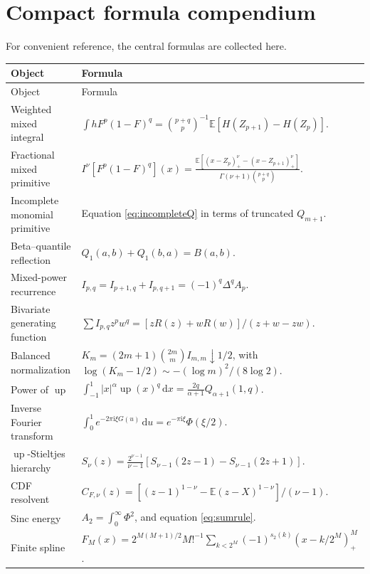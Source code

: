 \documentclass[11pt,oneside]{article}
\theoremstyle{definition}
\theoremstyle{remark}
\newcommand{\F}{F}
\newcommand{\G}{G}
\newcommand{\Up}{\operatorname{up}}
\newcommand{\E}{\mathbb E}
\newcommand{\dd}{\,\mathrm d}
\newcommand{\ii}{\mathrm i}
\begin{document}
\section{Compact formula compendium}

For convenient reference, the central formulas are collected here.

\begin{longtable}{>{\raggedright\arraybackslash}p{}p{}}
\toprule
Object & Formula \\
\midrule
\endfirsthead
\toprule
Object & Formula \\
\midrule
\endhead
Weighted mixed integral &
\(\displaystyle
\int h\F^p(1-\F)^q
=\binom{p+q}{p}^{-1}\E[H(Z_{p+1})-H(Z_p)]\).\\[0.75em]
Fractional mixed primitive &
\(\displaystyle
I^\nu[\F^p(1-\F)^q](x)
=\frac{\E[(x-Z_p)_+^\nu-(x-Z_{p+1})_+^\nu]}
{\Gamma(\nu+1)\binom{p+q}{p}}\).\\[0.75em]
Incomplete monomial primitive &
Equation \eqref{eq:incompleteQ} in terms of truncated \(Q_{m+1}\).\\[0.5em]
Beta--quantile reflection &
\(Q_1(a,b)+Q_1(b,a)=B(a,b)\).\\[0.5em]
Mixed-power recurrence &
\(I_{p,q}=I_{p+1,q}+I_{p,q+1}=(-1)^q\Delta^qA_p\).\\[0.5em]
Bivariate generating function &
\(\displaystyle\sum I_{p,q}z^pw^q=[zR(z)+wR(w)]/(z+w-zw)\).\\[0.75em]
Balanced normalization &
\(K_m=(2m+1)\binom{2m}{m}I_{m,m}\downarrow1/2\), with
\(\log(K_m-1/2)\sim-(\log m)^2/(8\log2)\).\\[0.75em]
Power of \(\Up\) &
\(\displaystyle\int_{-1}^1|x|^\alpha\Up(x)^q\dd x
=\frac{2q}{\alpha+1}Q_{\alpha+1}(1,q)\).\\[0.75em]
Inverse Fourier transform &
\(\displaystyle\int_0^1e^{-2\pi\ii\xi\G(u)}\dd u
=e^{-\pi\ii\xi}\Phi(\xi/2)\).\\[0.75em]
\(\Up\)-Stieltjes hierarchy &
\(\displaystyle S_\nu(z)=\frac{2^{\nu-1}}{\nu-1}
[S_{\nu-1}(2z-1)-S_{\nu-1}(2z+1)]\).\\[0.75em]
CDF resolvent &
\(\displaystyle C_{F,\nu}(z)=
[(z-1)^{1-\nu}-\E(z-X)^{1-\nu}]/(\nu-1)\).\\[0.75em]
Sinc energy &
\(\displaystyle A_2=\int_0^\infty\Phi^2\), and equation
\eqref{eq:sumrule}.\\[0.5em]
Finite spline &
\(\displaystyle\F_M(x)=2^{M(M+1)/2}M!^{-1}
\sum_{k<2^M}(-1)^{s_2(k)}(x-k/2^M)_+^M\).\\
\bottomrule
\end{longtable}
\end{document}

